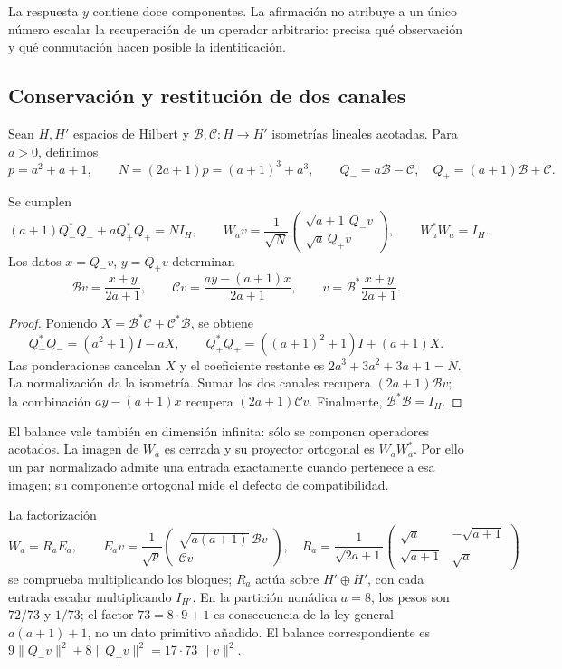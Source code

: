 La respuesta \(y\) contiene doce componentes. La afirmación no atribuye
a un único número escalar la recuperación de un operador arbitrario:
precisa qué observación y qué conmutación hacen posible la identificación.

\subsection{Conservación y restitución de dos canales}
\label{iv:subsec:acoplamiento-bilateral}

Sean \(H,H'\) espacios de Hilbert y
\(\mathcal B,\mathcal C:H\to H'\) isometrías lineales acotadas.
Para \(a>0\), definimos
\[
 p=a^2+a+1,\qquad N=(2a+1)p=(a+1)^3+a^3,\qquad
 Q_-=a\mathcal B-\mathcal C,\quad Q_+=(a+1)\mathcal B+\mathcal C.
\]

\begin{theorem}
\label{iv:thm:acoplamiento-balance}
Se cumplen
\[
 (a+1)Q_-^*Q_-+aQ_+^*Q_+=NI_H,\qquad
 W_av=\frac1{\sqrt N}
 \begin{pmatrix}\sqrt{a+1}\,Q_-v\\\sqrt a\,Q_+v\end{pmatrix},
 \qquad W_a^*W_a=I_H.
\]
Los datos \(x=Q_-v\), \(y=Q_+v\) determinan
\[
 \mathcal Bv=\frac{x+y}{2a+1},\qquad
 \mathcal Cv=\frac{ay-(a+1)x}{2a+1},\qquad
 v=\mathcal B^*\frac{x+y}{2a+1}.
\]
\end{theorem}
\begin{proof}
Poniendo \(X=\mathcal B^*\mathcal C+\mathcal C^*\mathcal B\), se obtiene
\[
 Q_-^*Q_-=(a^2+1)I-aX,\qquad
 Q_+^*Q_+=((a+1)^2+1)I+(a+1)X.
\]
Las ponderaciones cancelan \(X\) y el coeficiente restante es
\(2a^3+3a^2+3a+1=N\). La normalización da la isometría.
Sumar los dos canales recupera \((2a+1)\mathcal Bv\);
la combinación \(ay-(a+1)x\) recupera \((2a+1)\mathcal Cv\).
Finalmente, \(\mathcal B^*\mathcal B=I_H\).
\end{proof}

El balance vale también en dimensión infinita: sólo se componen
operadores acotados. La imagen de \(W_a\) es cerrada y su proyector
ortogonal es \(W_aW_a^*\). Por ello un par normalizado admite una
entrada exactamente cuando pertenece a esa imagen; su componente
ortogonal mide el defecto de compatibilidad.

La factorización
\[
 W_a=R_aE_a,\qquad
 E_av=\frac1{\sqrt p}
 \begin{pmatrix}\sqrt{a(a+1)}\,\mathcal Bv\\\mathcal Cv\end{pmatrix},
 \quad
 R_a=\frac1{\sqrt{2a+1}}
 \begin{pmatrix}\sqrt a&-\sqrt{a+1}\\
 \sqrt{a+1}&\sqrt a\end{pmatrix}
\]
se comprueba multiplicando los bloques; \(R_a\) actúa sobre
\(H'\oplus H'\), con cada entrada escalar multiplicando \(I_{H'}\).
En la partición nonádica
\(a=8\), los pesos son \(72/73\) y \(1/73\); el factor
\(73=8\cdot9+1\) es consecuencia de la ley general
\(a(a+1)+1\), no un dato primitivo añadido. El balance correspondiente es
\(9\|Q_-v\|^2+8\|Q_+v\|^2=17\cdot73\,\|v\|^2\).

